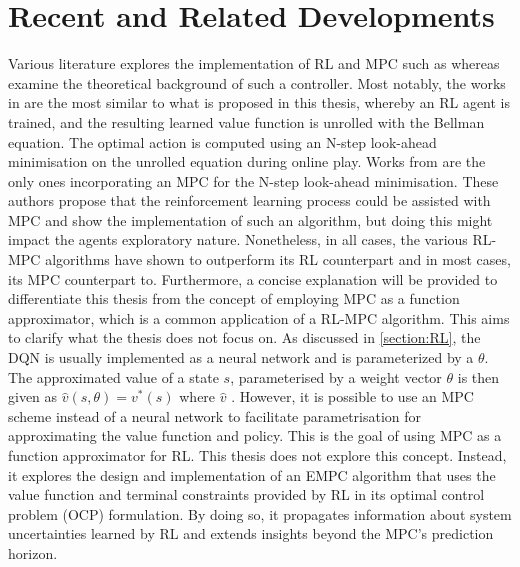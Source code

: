\section{Recent and Related Developments}
Various literature explores the implementation of RL and MPC  such as \cite{arroyoReinforcedModelPredictive2022,beckenbachAddressingInfinitehorizonOptimization2018,lubarsCombiningReinforcementLearning2021,lubbersAutonomousGreenhouseClimate2023,sikchiLearningOffPolicyOnline2021,} whereas  \cite{beckenbachAddressingInfinitehorizonOptimization2018,bertsekasLessonsAlphaZeroOptimal,bertsekasNewtonMethodReinforcement2022,linReinforcementLearningBasedModel2023} examine the theoretical background of such a controller.
Most notably, the works in \citet{sikchiLearningOffPolicyOnline2021,arroyoReinforcedModelPredictive2022,linReinforcementLearningBasedModel2023,bertsekasLessonsAlphaZeroOptimal} are the most similar to what is proposed in this thesis, whereby an RL agent is trained, and the resulting learned value function is unrolled with the Bellman equation. The optimal action is computed using an N-step look-ahead minimisation on the unrolled equation during online play. Works from \cite{arroyoReinforcedModelPredictive2022,linReinforcementLearningBasedModel2023,beckenbachAddressingInfinitehorizonOptimization2018} are the only ones incorporating an MPC for the N-step look-ahead minimisation. These authors propose that the reinforcement learning process could be assisted with MPC and show the implementation of such an algorithm, but doing this might impact the agents exploratory nature. Nonetheless, in all cases, the various RL-MPC algorithms have shown to outperform its RL counterpart and in most cases, its MPC counterpart to. Furthermore, a concise explanation will be provided to differentiate this thesis from the concept of employing MPC as a function approximator, which is a common application of a RL-MPC algorithm. This aims to clarify what the thesis does not focus on. As discussed in \autoref{section:RL}, the DQN is usually implemented as a neural network and is parameterized by a ${\theta}$. The approximated value of a state $s$, parameterised by a weight vector  $\theta$ is then given as $ \hat{v}(s,\theta) = v^*(s)$ where $\hat{v}$ \cite{lubbersAutonomousGreenhouseClimate2023}. However, it is possible to use an MPC scheme instead of a neural network to facilitate parametrisation for approximating the value function and policy. This is the goal of using MPC as a function approximator for RL. This thesis does not explore this concept. Instead, it explores the design and implementation of an EMPC algorithm that uses the value function and terminal constraints provided by RL in its optimal control problem (OCP) formulation. By doing so, it propagates information about system uncertainties learned by RL and extends insights beyond the MPC's prediction horizon.

